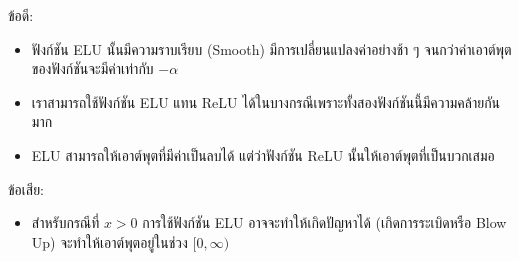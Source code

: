 \noindent ข้อดี:
\begin{itemize}[topsep=0pt,noitemsep]\setlength\itemsep{0.5em}
  \item ฟังก์ชัน ELU นั้นมีความราบเรียบ (Smooth) มีการเปลี่ยนแปลงค่าอย่างช้า ๆ จนกว่าค่าเอาต์พุตของฟังก์ชันจะมีค่าเท่ากับ $-\alpha$

  \item เราสามารถใช้ฟังก์ชัน ELU แทน ReLU ได้ในบางกรณีเพราะทั้งสองฟังก์ชันนี้มีความคล้ายกันมาก

  \item ELU สามารถให้เอาต์พุตที่มีค่าเป็นลบได้ แต่ว่าฟังก์ชัน ReLU นั้นให้เอาต์พุตที่เป็นบวกเสมอ
\end{itemize}
%
ข้อเสีย:
\begin{itemize}[topsep=0pt,noitemsep]\setlength\itemsep{0.5em}
  \item สำหรับกรณีที่ $x > 0$ การใช้ฟังก์ชัน ELU อาจจะทำให้เกิดปัญหาได้ (เกิดการระเบิดหรือ Blow Up) จะทำให้เอาต์พุตอยู่ในช่วง $[0,\infty)$
\end{itemize}
%
